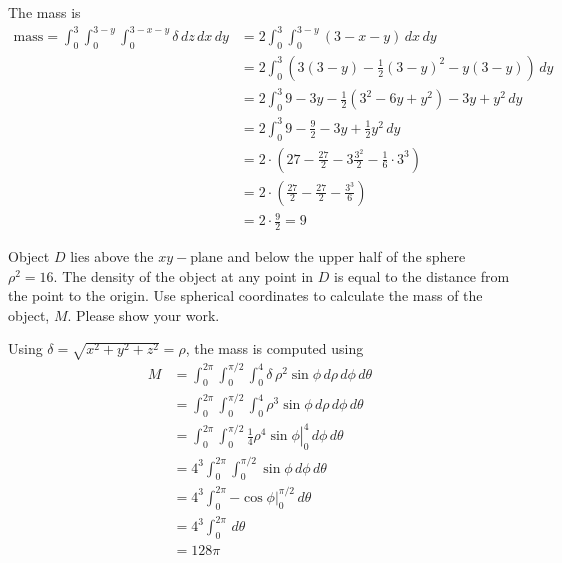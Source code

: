     \ifnum {} 
    {\color{DarkBlue} The mass is
    \begin{align}
        \text{mass}=\int_{0}^{3}\int_{0}^{3 - y} \int_0^{3 - x - y} \delta \, dz \, dx \, dy  
        &= 2 \int_{0}^{3}\int_{0}^{3 - y} (3-x-y ) \, dx \, dy \\ 
        &=2\int_{0}^{3} ( 3(3-y)  - \frac12(3-y)^2 -y(3-y) ) \, dy \\ 
        &=2\int_{0}^{3} 9 - 3y  - \frac12(3^2-6y+y^2) - 3y+y^2  \, dy \\ 
        &=2\int_{0}^{3} 9 - \frac92 - 3y + \frac12 y^2  \, dy \\ 
        &= 2 \cdot( 27- \frac{27}{2} - 3\frac {3^2}2 - \frac16\cdot3^3 ) \\
        &= 2 \cdot( \frac{27}{2} - \frac {27}2 - \frac{3^3}6 ) \\
        &= 2 \cdot \frac{9}{2}
        = 9
    \end{align}
    }
    \else

    \fi
\fi


\ifnum {}

\question[4] Object $D$ lies above the $xy-$plane and below the upper half of the sphere $\rho^2 = 16$. The density of the object at any point in $D$ is equal to the distance from the point to the origin. Use spherical coordinates to calculate the mass of the object, $M$. Please show your work. 
    
    \ifnum {} {\color{DarkBlue} Using $\delta = \sqrt{x^2+y^2+z^2} = \rho$, the mass is computed using 
    \begin{align}
        M &= \int_0^{2\pi} \int_0^{\pi/2} \int_0^4 \delta \, \rho^2\sin\phi \, d\rho\,d\phi\,d\theta \\
        &= \int_0^{2\pi} \int_0^{\pi/2} \int_0^4 \rho^3\sin\phi \, d\rho\,d\phi\,d\theta \\
        &= \int_0^{2\pi} \int_0^{\pi/2} \left. \frac14 \rho^4\sin\phi \right|_0^4 \, d\phi\,d\theta \\
        &= 4^3 \int_0^{2\pi} \int_0^{\pi/2} \sin\phi \, d\phi\,d\theta \\
        &= 4^3 \int_0^{2\pi} \left. -\cos\phi \right|_0^{\pi/2} \, d\theta \\
        &= 4^3 \int_0^{2\pi}  \, d\theta \\
        &= 128\pi
    \end{align}
    
    } 
   \else
      \vspace{1cm}
   \fi    
\fi